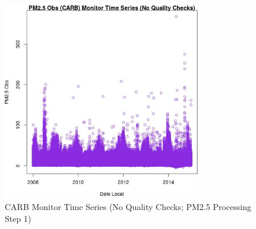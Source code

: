 
\begin{figure} 
\centering  
\includegraphics[width=0.77\textwidth]{Code_Outputs/PM25Source8TSstep1_PM25_ObsvDate_Local.jpg} 
\caption{\label{fig:PM25Source8TSstep1PM25_ObsvDate_Local}CARB Monitor Time Series (No Quality Checks; PM2.5 Processing Step 1)} 
\end{figure} 
 
